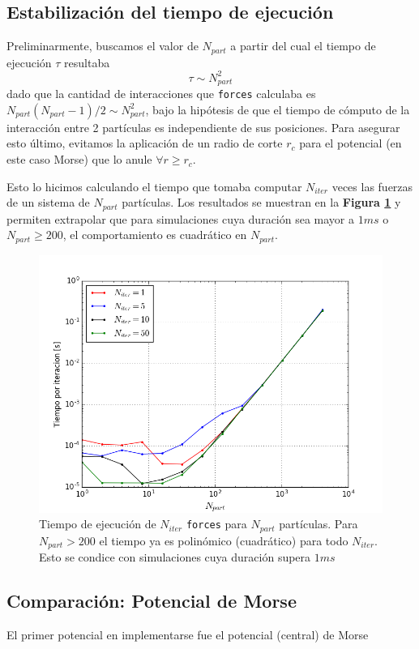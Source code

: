 \documentclass[twoside, 12pt]{article}
\begin{document}
\subsection{Estabilización del tiempo de ejecución}

Preliminarmente, buscamos el valor de $N_{part}$ a partir del cual el tiempo de ejecución $\tau$ resultaba \[\tau\sim N_{part}^2\] dado que la cantidad de interacciones que \texttt{forces} calculaba es $N_{part}(N_{part}-1)/2\sim N_{part}^2$, bajo la hipótesis de que el tiempo de cómputo de la interacción entre 2 partículas es independiente de sus posiciones. Para asegurar esto último, evitamos la aplicación de un radio de corte $r_c$ para el potencial (en este caso Morse) que lo anule $\forall r\geq r_c$.

Esto lo hicimos calculando el tiempo que tomaba computar $N_{iter}$ veces las fuerzas de un sistema de $N_{part}$ partículas. Los resultados se muestran en la \textbf{Figura \ref{fig:TvsNpart}} y permiten extrapolar que para simulaciones cuya duraci\'on sea mayor a $1ms$ o $N_{part}\geq200$, el comportamiento es cuadr\'atico en $N_{part}$.

\begin{figure}[h]
	\centering
	\includegraphics[width=0.65\columnwidth]{Estabilizacion_Npart.png}
	\caption{Tiempo de ejecución de $N_{iter}$ \texttt{forces} para $N_{part}$ partículas. Para $N_{part}>200$ el tiempo ya es polinómico (cuadrático) para todo $N_{iter}$. Esto se condice con simulaciones cuya duraci\'on supera $1ms$}
	\label{fig:TvsNpart}
\end{figure}

\subsection{Comparación: Potencial de Morse}

El primer potencial en implementarse fue el potencial (central) de Morse
\end{document}
